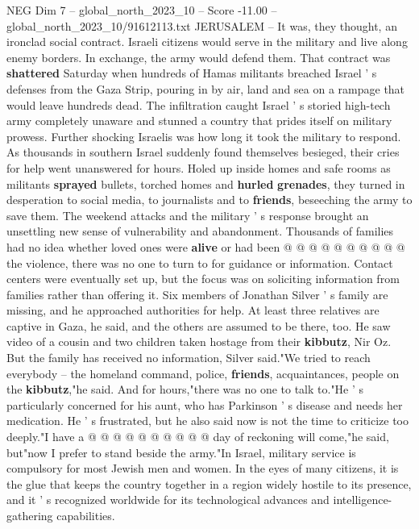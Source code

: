 \begin{textsample}{NEG Dim 7 – global\_north\_2023\_10 – Score -11.00 – global\_north\_2023\_10/91612113.txt}  \label{ex:f7_neg_026}
JERUSALEM -- It was, they thought, an ironclad social contract.
Israeli citizens would serve in the military and live along enemy borders.
In exchange, the army would defend them.
That contract was \textbf{shattered} Saturday when hundreds of Hamas militants breached Israel ' s defenses from the Gaza Strip, pouring in by air, land and sea on a rampage that would leave hundreds dead.
The infiltration caught Israel ' s storied high-tech army completely unaware and stunned a country that prides itself on military prowess.
Further shocking Israelis was how long it took the military to respond.
As thousands in southern Israel suddenly found themselves besieged, their cries for help went unanswered for hours.
Holed up inside homes and safe rooms as militants \textbf{sprayed} bullets, torched homes and \textbf{hurled} \textbf{grenades}, they turned in desperation to social media, to journalists and to \textbf{friends}, beseeching the army to save them.
The weekend attacks and the military ' s response brought an unsettling new sense of vulnerability and abandonment.
Thousands of families had no idea whether loved ones were \textbf{alive} or had been @ @ @ @ @ @ @ @ @ @ the violence, there was no one to turn to for guidance or information.
Contact centers were eventually set up, but the focus was on soliciting information from families rather than offering it.
Six members of Jonathan Silver ' s family are missing, and he approached authorities for help.
At least three relatives are captive in Gaza, he said, and the others are assumed to be there, too.
He saw video of a cousin and two children taken hostage from their \textbf{kibbutz}, Nir Oz.
But the family has received no information, Silver said."We tried to reach everybody -- the homeland command, police, \textbf{friends}, acquaintances, people on the \textbf{kibbutz},"he said.
And for hours,"there was no one to talk to."He ' s particularly concerned for his aunt, who has Parkinson ' s disease and needs her medication.
He ' s frustrated, but he also said now is not the time to criticize too deeply."I have a @ @ @ @ @ @ @ @ @ @ day of reckoning will come,"he said, but"now I prefer to stand beside the army."In Israel, military service is compulsory for most Jewish men and women.
In the eyes of many citizens, it is the glue that keeps the country together in a region widely hostile to its presence, and it ' s recognized worldwide for its technological advances and intelligence-gathering capabilities.

\end{textsample}
